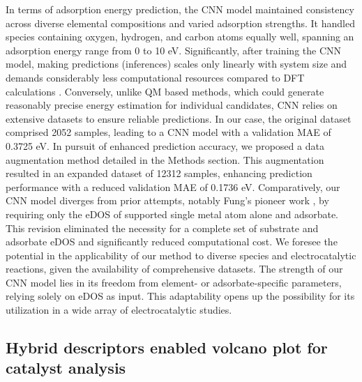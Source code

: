 \documentclass[a4paper, 12pt, titlepage]{article}
\begin{document}
    In terms of adsorption energy prediction, the CNN model maintained consistency across diverse elemental compositions and varied adsorption strengths.
    It handled species containing oxygen, hydrogen, and carbon atoms equally well, spanning an adsorption energy range from 0 to 10 eV.
    Significantly, after training the CNN model, making predictions (inferences) scales only linearly with system size and demands considerably less computational resources compared to DFT calculations \cite{chandrasekaran2019solving}.
    Conversely, unlike QM based methods, which could generate reasonably precise energy estimation for individual candidates, CNN relies on extensive datasets to ensure reliable predictions.
    In our case, the original dataset comprised 2052 samples, leading to a CNN model with a validation MAE of 0.3725 eV.
    In pursuit of enhanced prediction accuracy, we proposed a data augmentation method detailed in the Methods section.
    This augmentation resulted in an expanded dataset of 12312 samples, enhancing prediction performance with a reduced validation MAE of 0.1736 eV.
    Comparatively, our CNN model diverges from prior attempts, notably Fung's pioneer work \cite{fung2021machine}, by requiring only the eDOS of supported single metal atom alone and adsorbate.
    This revision eliminated the necessity for a complete set of substrate and adsorbate eDOS and significantly reduced computational cost.
    We foresee the potential in the applicability of our method to diverse species and electrocatalytic reactions, given the availability of comprehensive datasets.
    The strength of our CNN model lies in its freedom from element- or adsorbate-specific parameters, relying solely on eDOS as input.
    This adaptability opens up the possibility for its utilization in a wide array of electrocatalytic studies.


\subsection{Hybrid descriptors enabled volcano plot for catalyst analysis}
\end{document}

